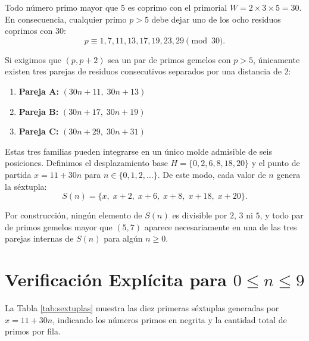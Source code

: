 \documentclass[11pt, a4paper]{article}
\begin{document}
Todo número primo mayor que $5$ es coprimo con el primorial $W = 2 \times 3 \times 5 = 30$. En consecuencia, cualquier primo $p > 5$ debe dejar uno de los ocho residuos coprimos con $30$:
\[
p \equiv 1, 7, 11, 13, 17, 19, 23, 29 \pmod{30}.
\]

Si exigimos que $(p, p+2)$ sea un par de primos gemelos con $p > 5$, únicamente existen tres parejas de residuos consecutivos separados por una distancia de $2$:
\begin{enumerate}
    \item \textbf{Pareja A:} $(30n + 11,\; 30n + 13)$
    \item \textbf{Pareja B:} $(30n + 17,\; 30n + 19)$
    \item \textbf{Pareja C:} $(30n + 29,\; 30n + 31)$
\end{enumerate}

Estas tres familias pueden integrarse en un único molde admisible de seis posiciones. Definimos el desplazamiento base $H = \{0, 2, 6, 8, 18, 20\}$ y el punto de partida $x = 11 + 30n$ para $n \in \{0, 1, 2, \dots\}$. De este modo, cada valor de $n$ genera la séxtupla:
\[
S(n) = \{x,\; x+2,\; x+6,\; x+8,\; x+18,\; x+20\}.
\]

Por construcción, ningún elemento de $S(n)$ es divisible por $2$, $3$ ni $5$, y todo par de primos gemelos mayor que $(5, 7)$ aparece necesariamente en una de las tres parejas internas de $S(n)$ para algún $n \ge 0$.

\section{Verificación Explícita para $0 \le n \le 9$}

La Tabla \ref{tab:sextuplas} muestra las diez primeras séxtuplas generadas por $x = 11 + 30n$, indicando los números primos en negrita y la cantidad total de primos por fila.
\end{document}
